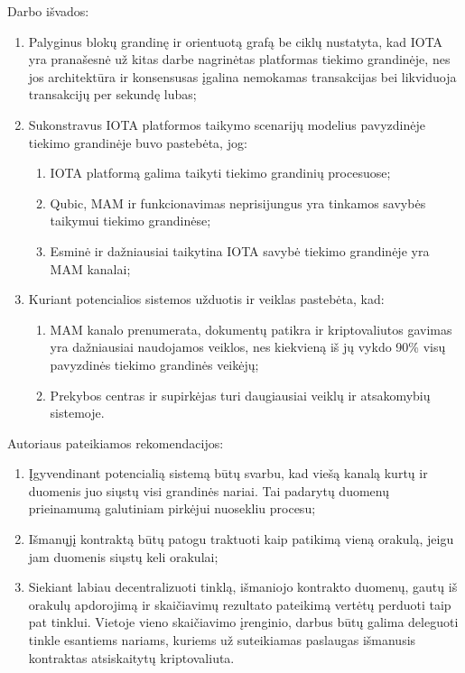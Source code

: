 

Darbo išvados:
\begin{enumerate}
    \item Palyginus blokų grandinę ir orientuotą grafą be ciklų nustatyta, kad IOTA yra pranašesnė už kitas darbe nagrinėtas platformas tiekimo grandinėje, nes jos architektūra ir konsensusas įgalina nemokamas transakcijas bei likviduoja transakcijų per sekundę lubas;
    \item Sukonstravus IOTA platformos taikymo scenarijų modelius pavyzdinėje tiekimo grandinėje buvo pastebėta, jog:
    \begin{enumerate}[label*=\arabic*.,topsep=0pt]
        \item IOTA platformą galima taikyti tiekimo grandinių procesuose;
        \item Qubic, MAM ir funkcionavimas neprisijungus yra tinkamos savybės taikymui tiekimo grandinėse;
        \item Esminė ir dažniausiai taikytina IOTA savybė tiekimo grandinėje yra MAM kanalai;
    \end{enumerate} 
    \item Kuriant potencialios sistemos užduotis ir veiklas pastebėta, kad:
    \begin{enumerate}[label*=\arabic*.,topsep=0pt]
        \item MAM kanalo prenumerata, dokumentų patikra ir kriptovaliutos gavimas yra dažniausiai naudojamos veiklos, nes kiekvieną iš jų vykdo 90\% visų pavyzdinės tiekimo grandinės veikėjų;
        \item Prekybos centras ir supirkėjas turi daugiausiai veiklų ir atsakomybių sistemoje.
    \end{enumerate}
\end{enumerate}
\bigskip

Autoriaus pateikiamos rekomendacijos:
\begin{enumerate}
    \item Įgyvendinant potencialią sistemą būtų svarbu, kad viešą kanalą kurtų ir duomenis juo siųstų visi grandinės nariai. Tai padarytų duomenų prieinamumą galutiniam pirkėjui nuosekliu procesu;
    \item Išmanųjį kontraktą būtų patogu traktuoti kaip patikimą vieną orakulą, jeigu jam duomenis siųstų keli orakulai;
    \item Siekiant labiau decentralizuoti tinklą, išmaniojo kontrakto duomenų, gautų iš orakulų apdorojimą ir skaičiavimų rezultato pateikimą vertėtų perduoti taip pat tinklui. Vietoje vieno skaičiavimo įrenginio, darbus būtų galima deleguoti tinkle esantiems nariams, kuriems už suteikiamas paslaugas išmanusis kontraktas atsiskaitytų kriptovaliuta.
\end{enumerate} 
\bigskip

